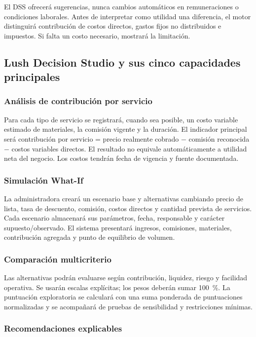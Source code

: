 El DSS ofrecerá sugerencias, nunca cambios automáticos en remuneraciones o condiciones laborales. Antes de interpretar como utilidad una diferencia, el motor distinguirá contribución de costos directos, gastos fijos no distribuidos e impuestos. Si falta un costo necesario, mostrará la limitación.


\subsection{Lush Decision Studio y sus cinco capacidades principales}

\subsubsection{Análisis de contribución por servicio}

Para cada tipo de servicio se registrará, cuando sea posible, un costo variable estimado de materiales, la comisión vigente y la duración. El indicador principal será contribución por servicio = precio realmente cobrado − comisión reconocida − costos variables directos. El resultado no equivale automáticamente a utilidad neta del negocio. Los costos tendrán fecha de vigencia y fuente documentada.


\subsubsection{Simulación What-If}

La administradora creará un escenario base y alternativas cambiando precio de lista, tasa de descuento, comisión, costos directos y cantidad prevista de servicios. Cada escenario almacenará sus parámetros, fecha, responsable y carácter supuesto/observado. El sistema presentará ingresos, comisiones, materiales, contribución agregada y punto de equilibrio de volumen.


\subsubsection{Comparación multicriterio}

Las alternativas podrán evaluarse según contribución, liquidez, riesgo y facilidad operativa. Se usarán escalas explícitas; los pesos deberán sumar 100~\%. La puntuación exploratoria se calculará con una suma ponderada de puntuaciones normalizadas y se acompañará de pruebas de sensibilidad y restricciones mínimas.


\subsubsection{Recomendaciones explicables}

